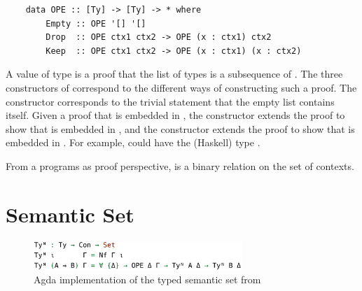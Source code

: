 \begin{lstlisting}
    data OPE :: [Ty] -> [Ty] -> * where
        Empty :: OPE '[] '[]
        Drop  :: OPE ctx1 ctx2 -> OPE (x : ctx1) ctx2
        Keep  :: OPE ctx1 ctx2 -> OPE (x : ctx1) (x : ctx2)
\end{lstlisting}

A value of type  is a proof that the list of types  is a subsequence of . The three constructors of  correspond to the different ways of constructing such a proof. The  constructor corresponds to the trivial statement that the empty list contains itself. Given a proof that  is embedded in , the  constructor extends the proof to show that  is embedded in , and the  constructor extends the proof to show that  is embedded in . For example,  could have the (Haskell) type . 

From a programs as proof perspective,  is a binary relation on the set of contexts.



\section{Semantic Set}

\begin{figure}[h]
    \centering
    \includegraphics[width=0.7\textwidth]{./images/typed_semantic_set.png}
    \caption{Agda implementation of the typed semantic set from \cite{AgdaNbe}}
    \label{fig:agdaSemanticSet}
\end{figure}




